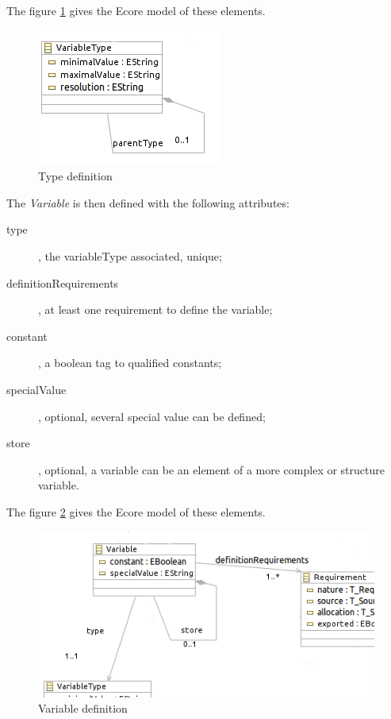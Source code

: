 The figure \ref{fig:Type} gives the Ecore model of these elements.

\begin{figure}[ht]
  \centering
  \includegraphics{DataModel/Type3.png}
  \caption{Type definition}
  \label{fig:Type}
\end{figure}

The \textit{Variable} is then defined with the following attributes:
\begin{description}
\item[type], the variableType associated, unique;
\item[definitionRequirements], at least one requirement to  define the variable;
\item[constant], a boolean tag to qualified constants;
\item[specialValue], optional, several special value can be defined;
\item[store], optional, a variable can be an element of a more complex or structure variable.
\end{description}

The figure \ref{fig:variable} gives the Ecore model of these elements.


\begin{figure}[ht]
  \centering
  \includegraphics{DataModel/Variable3.png}
  \caption{Variable definition}
  \label{fig:variable}
\end{figure}



